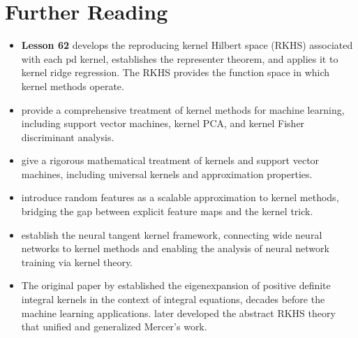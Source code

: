\documentclass[11pt,a4paper]{article}
\begin{document}
\section{Further Reading}
\label{sec:further-reading}

\begin{itemize}
    \item \textbf{Lesson 62} develops the reproducing kernel Hilbert
    space (RKHS) associated with each pd kernel, establishes the
    representer theorem, and applies it to kernel ridge regression.
    The RKHS provides the function space in which kernel methods
    operate.

    \item \citet{scholkopf2002} provide a comprehensive treatment of
    kernel methods for machine learning, including support vector
    machines, kernel PCA, and kernel Fisher discriminant analysis.

    \item \citet{steinwart2008} give a rigorous mathematical
    treatment of kernels and support vector machines, including
    universal kernels and approximation properties.

    \item \citet{rahimi2008} introduce random features as a
    scalable approximation to kernel methods, bridging the gap
    between explicit feature maps and the kernel trick.

    \item \citet{jacot2018} establish the neural tangent kernel
    framework, connecting wide neural networks to kernel methods and
    enabling the analysis of neural network training via kernel theory.

    \item The original paper by \citet{mercer1909} established the
    eigenexpansion of positive definite integral kernels in the
    context of integral equations, decades before the machine learning
    applications. \citet{aronszajn1950} later developed the abstract
    RKHS theory that unified and generalized Mercer's work.
\end{itemize}


\end{document}
